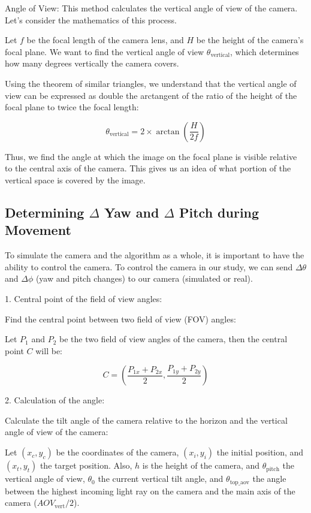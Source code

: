 Angle of View: 
This method calculates the vertical angle of view of the camera. Let's consider the mathematics of this process.

Let $f$ be the focal length of the camera lens, and $H$ be the height of the camera's focal plane. We want to find the vertical angle of view $\theta_{\text{vertical}}$, which determines how many degrees vertically the camera covers.

Using the theorem of similar triangles, we understand that the vertical angle of view can be expressed as double the arctangent of the ratio of the height of the focal plane to twice the focal length:

$$
\theta_{\text{vertical}} = 2 \times \arctan \left( \frac{H}{2f} \right)
$$

Thus, we find the angle at which the image on the focal plane is visible relative to the central axis of the camera. This gives us an idea of what portion of the vertical space is covered by the image.

\subsection{Determining $\Delta$ Yaw and $\Delta$ Pitch during Movement}
To simulate the camera and the algorithm as a whole, it is important to have the ability to control the camera.
To control the camera in our study, we can send $\Delta \theta$ and $\Delta \phi$ (yaw and pitch changes) to our camera (simulated or real).

1. Central point of the field of view angles:

   Find the central point between two field of view (FOV) angles:

   Let $ P_1  $ and  $ P_2  $ be the two field of view angles of the camera, then the central point $ C  $ will be:

    $$
   C = \left( \frac{P_{1x} + P_{2x}}{2}, \frac{P_{1y} + P_{2y}}{2} \right)
    $$

2. Calculation of the angle:

   Calculate the tilt angle of the camera relative to the horizon and the vertical angle of view of the camera:

   Let $ (x_c, y_c)  $ be the coordinates of the camera, $ (x_i, y_i)  $ the initial position, and $ (x_t, y_t)  $ the target position. Also, $ h  $ is the height of the camera, and $ \theta_{\text{pitch}}  $ the vertical angle of view, $\theta_0$ the current vertical tilt angle, and $\theta_{\text{top\_aov}}$ the angle between the highest incoming light ray on the camera and the main axis of the camera ($AOV_{\text{vert}}/2$).

